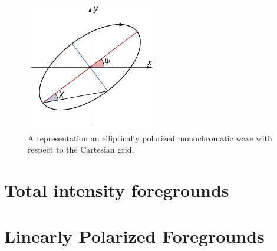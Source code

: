 \begin{figure}
\centering
\includegraphics[width=0.5\textwidth]{chapters/astropol/figures/pol_ellipse.png}
\caption{A representation an elliptically polarized monochromatic wave with respect to the Cartesian grid.}
\label{fig:astropol_pol_ellipse}
\end{figure}


\section{Total intensity foregrounds}



\section{Linearly Polarized Foregrounds}
